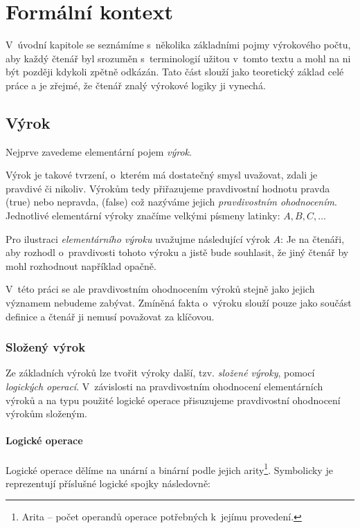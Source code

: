 \documentclass[thesis=B,czech,hidelinks]{FITthesis}[2012/06/26]
\begin{document}
\chapter{Formální kontext}

V~úvodní kapitole se seznámíme s~několika základními pojmy výrokového počtu, aby každý čtenář byl srozuměn s~terminologií užitou v~tomto textu a mohl na ni být později kdykoli zpětně odkázán. Tato část slouží jako teoretický základ celé práce a je zřejmé, že čtenář znalý výrokové logiky ji vynechá.

\section{Výrok}

Nejprve zavedeme elementární pojem \emph{výrok}.

Výrok je takové tvrzení, o~kterém má dostatečný smysl uvažovat, zdali je pravdivé či nikoliv. Výrokům tedy přiřazujeme pravdivostní hodnotu pravda (true) nebo nepravda, (false) což nazýváme jejich \emph{pravdivostním ohodnocením}. Jednotlivé elementární výroky značíme velkými písmeny latinky: $A, B, C, \ldots$

\begin{ex}
Pro ilustraci \emph{elementárního výroku} uvažujme následující výrok $A$:  Je na čtenáři, aby rozhodl o~pravdivosti tohoto výroku a jistě bude souhlasit, že jiný čtenář by mohl rozhodnout například opačně.
\end{ex}

V~této práci se ale pravdivostním ohodnocením výroků stejně jako jejich významem nebudeme zabývat. Zmíněná fakta o~výroku slouží pouze jako součást definice a čtenář ji nemusí považovat za klíčovou.

\subsection{Složený výrok}

Ze základních výroků lze tvořit výroky další, tzv. \emph{složené výroky}, pomocí \emph{logických operací}. V~závislosti na pravdivostním ohodnocení elementárních výroků a na typu použité logické operace přisuzujeme pravdivostní ohodnocení výrokům složeným.

\subsubsection{Logické operace}

Logické operace dělíme na unární a binární podle jejich arity\footnote{Arita -- počet operandů operace potřebných k~jejímu provedení.}. Symbolicky je reprezentují příslušné logické spojky následovně:
\end{document}
